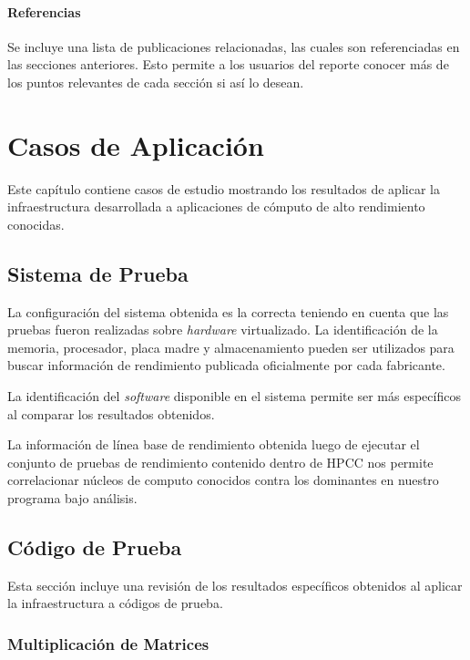 \documentclass[a4paper]{report}
\begin{document}
\subsubsection{Referencias}

Se incluye una lista de publicaciones relacionadas, las cuales son referenciadas en las secciones anteriores.
Esto permite a los usuarios del reporte conocer más de los puntos relevantes de cada sección si así lo desean.

\chapter{Casos de Aplicación} \label{Casos de Aplicacion}

Este capítulo contiene casos de estudio mostrando los resultados de aplicar la infraestructura desarrollada a aplicaciones de cómputo de alto rendimiento conocidas.

\section{Sistema de Prueba}

La configuración del sistema obtenida es la correcta teniendo en cuenta que las pruebas fueron realizadas sobre {\it hardware} virtualizado. La identificación de la memoria, procesador,
placa madre y almacenamiento pueden ser utilizados para buscar información de rendimiento publicada oficialmente por cada fabricante.

\bigskip

La identificación del {\it software} disponible en el sistema permite ser más específicos al comparar los resultados obtenidos.

\bigskip

La información de línea base de rendimiento obtenida luego de ejecutar el conjunto de pruebas de rendimiento contenido dentro de HPCC nos permite correlacionar núcleos de computo
conocidos contra los dominantes en nuestro programa bajo análisis.

\section{Código de Prueba}

Esta sección incluye una revisión de los resultados específicos obtenidos al aplicar la infraestructura a códigos de prueba.

\subsection{Multiplicación de Matrices}
\end{document}

